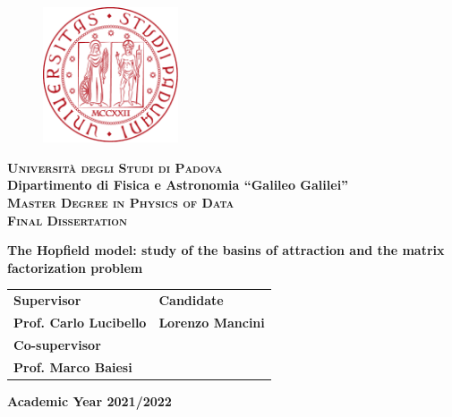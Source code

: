 \begin{titlepage}
    \vspace{5mm}
    \begin{figure}[hbtp]
    \centering
    \includegraphics[height = 4cm]{images/Logo.pdf}
    \end{figure}
    \vspace{5mm}
    \begin{center}
    {{\huge{\textsc{\bf Universit\`a degli Studi di Padova}}}\\}
    \vspace{5mm}
    {\Large{\bf Dipartimento di Fisica e Astronomia ``Galileo Galilei''}} \\
    \vspace{5mm}
    {\Large{\textsc{\bf Master Degree in Physics of Data}}}\\
    \vspace{20mm}
    {\Large{\textsc{\bf Final Dissertation}}}\\
    \vspace{30mm}
    \begin{spacing}{3}
    {\LARGE \textbf{The Hopfield model: study of the basins of attraction and the matrix factorization problem}}\\
    \end{spacing}
    \vspace{8mm}
    \end{center}
    \vspace{10mm}

    \begin{spacing}{2}
    \begin{tabularx}{\linewidth}{@{}X >{\raggedleft\arraybackslash}X@{}}
   {\Large \bf Supervisor} & {\Large \bf Candidate} \\
   {\Large{\bf Prof. Carlo Lucibello}} & {\Large{\bf Lorenzo Mancini}} \\
   {\Large \bf Co-supervisor} & {} \\
   {\Large \bf Prof. Marco Baiesi}
   \end{tabularx} 
    \end{spacing}
    
    \vfill
    \begin{center}
    {\Large{\bf Academic Year 2021/2022}}
    \end{center}
\end{titlepage}
\restoregeometry
\clearpage{\pagestyle{empty}\cleardoublepage}